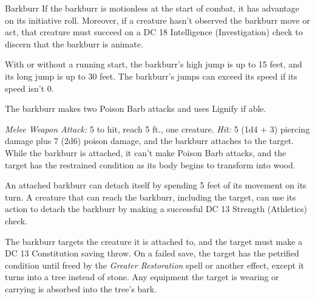 \documentclass[10pt,a4paper,twoside,bg=print,twocolumn,openany,nodeprecatedcode]{dndbook}
\begin{document}
\begin{DndMonster}[float=t]{Barkburr}
\DndMonsterBasics[
armor-class = {16 (natural armor)},
hit-points = {\DndDice{8d6 + 24}},
speed = {10 ft., climb 10 ft.}
]
\DndMonsterAbilityScores[
 str = 16,
 dex = 6,
 con = 16,
 int = 1,
 wis = 15,
 cha = 1
]
\DndMonsterDetails[
skills = {Athletics +5},
damage-immunities = {psychic},
condition-immunities = {blinded, charmed, deafened, frightened},
senses = {blindsight 60 ft. (can't see beyond this radius), passive perception 12},
challenge = 3,
]
If the barkburr is motionless at the start of combat, it has advantage on its initiative roll. Moreover, if a creature hasn't observed the barkburr move or act, that creature must succeed on a DC 18 Intelligence (Investigation) check to discern that the barkburr is animate.

With or without a running start, the barkburr's high jump is up to 15 feet, and its long jump is up to 30 feet. The barkburr's jumps can exceed its speed if its speed isn't 0.

The barkburr makes two Poison Barb attacks and uses Lignify if able.

\textsl{Melee Weapon Attack:} 5 to hit, reach 5 ft., one creature. \textsl{Hit:} 5 (1d4 + 3) piercing damage plus 7 (2d6) poison damage, and the barkburr attaches to the target. While the barkburr is attached, it can't make Poison Barb attacks, and the target has the restrained condition as its body begins to transform into wood.

An attached barkburr can detach itself by spending 5 feet of its movement on its turn. A creature that can reach the barkburr, including the target, can use its action to detach the barkburr by making a successful DC 13 Strength (Athletics) check.

The barkburr targets the creature it is attached to, and the target must make a DC 13 Constitution saving throw. On a failed save, the target has the petrified condition until freed by the \textit{Greater Restoration} spell or another effect, except it turns into a tree instead of stone. Any equipment the target is wearing or carrying is absorbed into the tree's bark.

\end{DndMonster}
\end{document}
